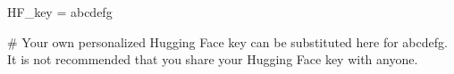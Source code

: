 HF_key = abcdefg

# Your own personalized Hugging Face key can be substituted here for abcdefg. It is not recommended that you share your Hugging Face key with anyone.
